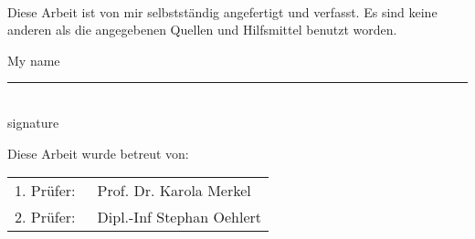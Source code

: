 \clearpage

\mbox{}
\vspace{1.5cm}\\
\noindent Diese Arbeit ist von mir selbstständig angefertigt und verfasst. Es sind keine anderen als die angegebenen Quellen und Hilfsmittel benutzt worden.

\vspace{1cm}
My name \tab[1.5cm] \rule{40mm}{0.2mm}\\
\tab[5cm] signature

\vspace{3cm}
Diese Arbeit wurde betreut von:

\begin{minipage}[t]{13cm}
	\centering
	\begin{tabular}{p{4cm}l}

		1. Pr\"{u}fer: & ~Prof. Dr. Karola Merkel   \\
		2. Pr\"{u}fer: & ~Dipl.-Inf Stephan Oehlert \\

	\end{tabular}
\end{minipage}

\vspace{1.5cm}
